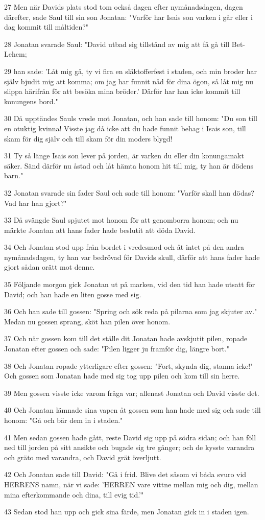 \par 27 Men när Davids plats stod tom också dagen efter nymånadsdagen, dagen därefter, sade Saul till sin son Jonatan: "Varför har Isais son varken i går eller i dag kommit till måltiden?"
\par 28 Jonatan svarade Saul: "David utbad sig tillstånd av mig att få gå till Bet-Lehem;
\par 29 han sade: 'Låt mig gå, ty vi fira en släktofferfest i staden, och min broder har själv bjudit mig att komma; om jag har funnit nåd för dina ögon, så låt mig nu slippa härifrån för att besöka mina bröder.' Därför har han icke kommit till konungens bord."
\par 30 Då upptändes Sauls vrede mot Jonatan, och han sade till honom: "Du son till en otuktig kvinna! Visste jag då icke att du hade funnit behag i Isais son, till skam för dig själv och till skam för din moders blygd!
\par 31 Ty så länge Isais son lever på jorden, är varken du eller din konungamakt säker. Sänd därför nu åstad och låt hämta honom hit till mig, ty han är dödens barn."
\par 32 Jonatan svarade sin fader Saul och sade till honom: "Varför skall han dödas? Vad har han gjort?"
\par 33 Då svängde Saul spjutet mot honom för att genomborra honom; och nu märkte Jonatan att hans fader hade beslutit att döda David.
\par 34 Och Jonatan stod upp från bordet i vredesmod och åt intet på den andra nymånadsdagen, ty han var bedrövad för Davids skull, därför att hans fader hade gjort sådan orätt mot denne.
\par 35 Följande morgon gick Jonatan ut på marken, vid den tid han hade utsatt för David; och han hade en liten gosse med sig.
\par 36 Och han sade till gossen: "Spring och sök reda på pilarna som jag skjuter av." Medan nu gossen sprang, sköt han pilen över honom.
\par 37 Och när gossen kom till det ställe dit Jonatan hade avskjutit pilen, ropade Jonatan efter gossen och sade: "Pilen ligger ju framför dig, längre bort."
\par 38 Och Jonatan ropade ytterligare efter gossen: "Fort, skynda dig, stanna icke!" Och gossen som Jonatan hade med sig tog upp pilen och kom till sin herre.
\par 39 Men gossen visste icke varom fråga var; allenast Jonatan och David visste det.
\par 40 Och Jonatan lämnade sina vapen åt gossen som han hade med sig och sade till honom: "Gå och bär dem in i staden."
\par 41 Men sedan gossen hade gått, reste David sig upp på södra sidan; och han föll ned till jorden på sitt ansikte och bugade sig tre gånger; och de kysste varandra och gräto med varandra, och David grät överljutt.
\par 42 Och Jonatan sade till David: "Gå i frid. Blive det såsom vi båda svuro vid HERRENS namn, när vi sade: 'HERREN vare vittne mellan mig och dig, mellan mina efterkommande och dina, till evig tid.'"
\par 43 Sedan stod han upp och gick sina färde, men Jonatan gick in i staden igen.

